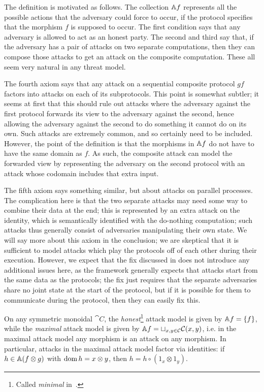 The definition is motivated as follows. The collection $\AA f$ represents all
the possible actions that the adversary could force to occur, if the protocol
specifies that the morphism $f$ is supposed to occur. The first condition says
that any adversary is allowed to act as an honest party. The second and third
say that, if the adversary has a pair of attacks on two separate computations,
then they can compose those attacks to get an attack on the composite
computation. These all seem very natural in any threat model.

The fourth axiom says that any attack on a sequential composite protocol $gf$
factors into attacks on each of its subprotocols. This point is somewhat
subtler; it seems at first that this should rule out attacks where the adversary
against the first protocol forwards its view to the adversary against the second,
hence allowing the adversary against the second to do something it cannot do on
its own. Such attacks are extremely common, and so certainly need to be
included. However, the point of the definition is that the morphisms in $\AA f$
do not have to have the same domain as $f$. As such, the composite attack can
model the forwarded view by representing the adversary on the second protocol
with an attack whose codomain includes that extra input.

The fifth axiom says something similar, but about attacks on parallel processes.
The complication here is that the two separate attacks may need some way to
combine their data at the end; this is represented by an extra attack on the
identity, which is semantically identified with the do-nothing computation; such
attacks thus generally consist of adversaries manipulating their own state. We
will say more about this axiom in the conclusion; we are skeptical that it is
sufficient to model attacks which play the protocols off of each other during
their execution. However, we expect that the fix discussed in 
does not introduce any additional issues here, as the framework generally
expects that attacks start from the same data as the protocols; the fix just
requires that the separate adversaries share no joint state at the start of the
protocol, but if it is possible for them to communicate during the protocol,
then they can easily fix this.

\begin{ex}\label{ex:trivial-attacks}
  On any symmetric monoidal $\cat{C}$, the \emph{honest}\footnote{Called
  \emph{minimal} in~\cite{broadbent-karvonen-2022}.} attack model is given
  by $\AA f = \{f\}$, while the \emph{maximal} attack model is given by $\AA f =
  \sqcup_{x,y\in\cat{C}}\cat{C}(x, y)$, i.e. in the maximal attack model any
  morphism is an attack on any morphism. In particular, attacks in the maximal
  attack model factor via identities: if $h\in\AA (f\otimes g)$ with $\dom h =
  x\otimes y$, then $h = h\circ (1_x\otimes 1_y)$.
\end{ex}

